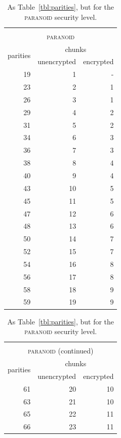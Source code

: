 \documentclass[manuscript,screen,review]{acmart}
\begin{document}
\begin{table}[!ht]
\caption{As Table~\ref{tbl:parities}, but for the \textsc{paranoid} security level.}
\begin{minipage}{.49\linewidth}
\centering
\begin{tabular}{|r|r|r|}
\multicolumn{3}{c}{\textsc{}}\\
\multicolumn{3}{c}{\textsc{paranoid}}\\\hline
\multirow{2}{1.5cm}{\centering 
 parities } 
&\multicolumn{2}{|c|}{ chunks }\\\cline{2-3}
&\multicolumn{1}{|c|}{unencrypted} 
&\multicolumn{1}{|c|}{encrypted} \\\hline\hline
19 & 1 & -\\
23 & 2  & 1\\
26 & 3  & 1\\
29 & 4  & 2\\
31 & 5  & 2\\
34 & 6  & 3\\
36 & 7  & 3\\
38 & 8  & 4\\
40 & 9  & 4\\
43 & 10 & 5\\
45 & 11 & 5\\
47 & 12 & 6\\
48 & 13 & 6\\
50 & 14 & 7\\
52 & 15 & 7\\
54 & 16 & 8\\
56 & 17 & 8\\
58 & 18 & 9\\
59 & 19 & 9\\
\hline
\end{tabular}
\end{minipage}
\begin{minipage}{.49\linewidth}
\centering
\begin{tabular}{|r|r|r|}
\multicolumn{3}{c}{\textsc{}}\\
\multicolumn{3}{c}{\textsc{paranoid} (continued)}\\\hline
\multirow{2}{1.5cm}{\centering 
 parities } 
&\multicolumn{2}{|c|}{ chunks }\\\cline{2-3}
&\multicolumn{1}{|c|}{unencrypted} 
&\multicolumn{1}{|c|}{encrypted} \\\hline\hline
61 & 20 & 10\\
63 & 21 & 10\\
65 & 22 & 11\\
66 & 23 & 11\\

\end{tabular}
\end{minipage}
\end{table}
\end{document}
